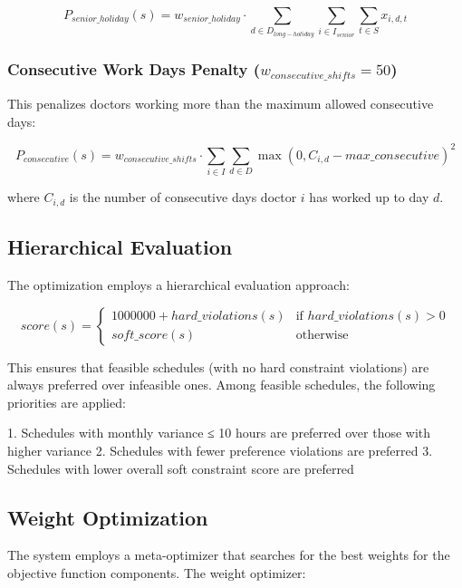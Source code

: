 \documentclass[12pt]{article}
\begin{document}
\begin{equation}
P_{senior\_holiday}(s) = w_{senior\_holiday} \cdot \sum_{d \in D_{long-holiday}} \sum_{i \in I_{senior}} \sum_{t \in S} x_{i,d,t}
\end{equation}

\subsubsection{Consecutive Work Days Penalty ($w_{consecutive\_shifts} = 50$)}
This penalizes doctors working more than the maximum allowed consecutive days:

\begin{equation}
P_{consecutive}(s) = w_{consecutive\_shifts} \cdot \sum_{i \in I} \sum_{d \in D} \max(0, C_{i,d} - max\_consecutive)^2
\end{equation}

where $C_{i,d}$ is the number of consecutive days doctor $i$ has worked up to day $d$.

\subsection{Hierarchical Evaluation}

The optimization employs a hierarchical evaluation approach:

\begin{equation}
score(s) = 
\begin{cases} 
1000000 + hard\_violations(s) & \text{if } hard\_violations(s) > 0 \\
soft\_score(s) & \text{otherwise}
\end{cases}
\end{equation}

This ensures that feasible schedules (with no hard constraint violations) are always preferred over infeasible ones. Among feasible schedules, the following priorities are applied:

1. Schedules with monthly variance ≤ 10 hours are preferred over those with higher variance
2. Schedules with fewer preference violations are preferred
3. Schedules with lower overall soft constraint score are preferred

\subsection{Weight Optimization}

The system employs a meta-optimizer that searches for the best weights for the objective function components. The weight optimizer:
\end{document}
